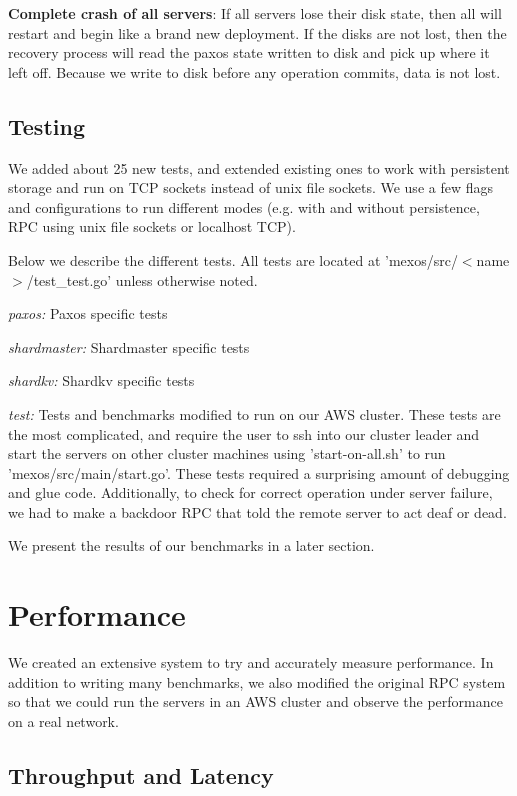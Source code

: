 \documentclass[letterpaper,10pt]{article}
\begin{document}
\textbf{Complete crash of all servers}: If all servers lose their disk
state, then all will restart and begin like a brand new deployment. If
the disks are not lost, then the recovery process will read the paxos
state written to disk and pick up where it left off. Because we write
to disk before any operation commits, data is not lost.

\subsection{Testing}
We added about 25 new tests, and extended existing ones to work with
persistent storage and run on TCP sockets instead of unix file
sockets. We use a few flags and configurations to run different modes
(e.g. with and without persistence, RPC using unix file sockets or
localhost TCP).

Below we describe the different tests. All tests are located at
'mexos/src/$<$name$>$/test\_test.go' unless otherwise noted.

\emph{paxos:} Paxos specific tests

\emph{shardmaster:} Shardmaster specific tests

\emph{shardkv:} Shardkv specific tests

\emph{test:} Tests and benchmarks modified to run on our AWS
cluster. These tests are the most complicated, and require the user to
ssh into our cluster leader and start the servers on other cluster
machines using 'start-on-all.sh' to run
'mexos/src/main/start.go'. These tests required a surprising amount of
debugging and glue code. Additionally, to check for correct operation
under server failure, we had to make a backdoor RPC that told the
remote server to act deaf or dead.

We present the results of our benchmarks in a later section.

\section{Performance}

We created an extensive system to try and accurately measure
performance. In addition to writing many benchmarks, we also modified
the original RPC system so that we could run the servers in an AWS
cluster and observe the performance on a real network.

\subsection{Throughput and Latency}
\end{document}
